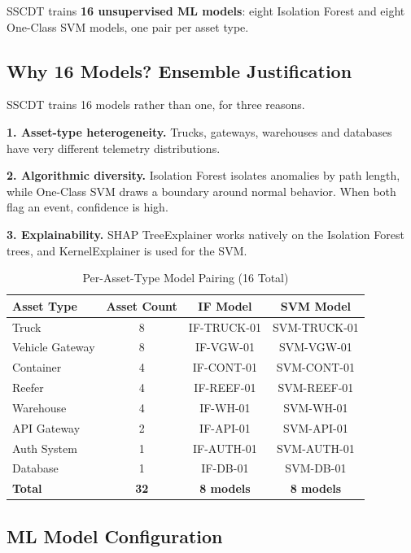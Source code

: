 \documentclass[12pt,a4paper]{amritareport}
\begin{document}
SSCDT trains \textbf{16 unsupervised ML models}: eight Isolation Forest and eight One-Class SVM models, one pair per asset type.

\subsection{Why 16 Models? Ensemble Justification}

SSCDT trains 16 models rather than one, for three reasons.

\textbf{1. Asset-type heterogeneity.} Trucks, gateways, warehouses and databases have very different telemetry distributions.

\textbf{2. Algorithmic diversity.} Isolation Forest isolates anomalies by path length, while One-Class SVM draws a boundary around normal behavior. When both flag an event, confidence is high.

\textbf{3. Explainability.} SHAP TreeExplainer works natively on the Isolation Forest trees, and KernelExplainer is used for the SVM.

\begin{table}[H]
\centering
\caption{Per-Asset-Type Model Pairing (16 Total)}
\label{tab:model_pairing}
\begin{tabular}{@{}lccc@{}}
\toprule
\textbf{Asset Type} & \textbf{Asset Count} & \textbf{IF Model} & \textbf{SVM Model} \\
\midrule
Truck & 8 & IF-TRUCK-01 & SVM-TRUCK-01 \\
Vehicle Gateway & 8 & IF-VGW-01 & SVM-VGW-01 \\
Container & 4 & IF-CONT-01 & SVM-CONT-01 \\
Reefer & 4 & IF-REEF-01 & SVM-REEF-01 \\
Warehouse & 4 & IF-WH-01 & SVM-WH-01 \\
API Gateway & 2 & IF-API-01 & SVM-API-01 \\
Auth System & 1 & IF-AUTH-01 & SVM-AUTH-01 \\
Database & 1 & IF-DB-01 & SVM-DB-01 \\
\midrule
\textbf{Total} & \textbf{32} & \textbf{8 models} & \textbf{8 models} \\
\bottomrule
\end{tabular}
\end{table}

\subsection{ML Model Configuration}
\end{document}
